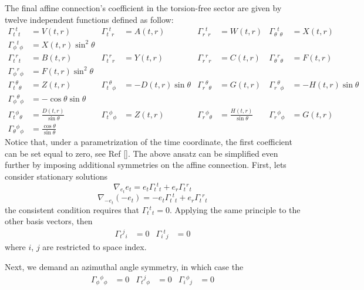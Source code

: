 \documentclass{article}
\providecommand{\ctG}[3]{\Gamma_{#1}{}^{ #2}{}_{#3}}
\begin{document}
The final affine connection's coefficient in the torsion-free sector are given by
twelve independent functions defined as follow:
\begin{equation}
\begin{aligned}
    \ctG{t}{t}{t} & = V(t,r) & \ctG{t}{t}{r} & = A(t,r) & \ctG{r}{t}{r} & = W(t,r) & \ctG{\theta}{t}{\theta} & = X(t,r) \\
    \ctG{\phi}{t}{\phi} & = X(t,r)\sin^2\theta \\
    \ctG{t}{r}{t} & = B(t,r) & \ctG{t}{r}{r} & = Y(t,r) & \ctG{r}{r}{r} & = C(t,r) & \ctG{\theta}{r}{\theta} & = F(t,r) \\
    \ctG{\phi}{r}{\phi} & = F(t,r)\sin^2\theta  \\
    \ctG{t}{\theta}{\theta} & = Z(t,r) & \ctG{t}{\theta}{\phi} & = -D(t,r)\sin\theta & \ctG{r}{\theta}{\theta} & = G(t,r) & \ctG{r}{\theta}{\phi} & = -H(t,r)\sin\theta \\ 
    \ctG{\phi}{\theta}{\phi} & = -\cos\theta\sin\theta \\
    \ctG{t}{\phi}{\theta} & = \frac{D(t,r)}{\sin\theta} & \ctG{t}{\phi}{\phi} & = Z(t,r) & \ctG{r}{\phi}{\theta} & = \frac{H(t,r)}{\sin\theta} & \ctG{r}{\phi}{\phi} & = G(t,r) \\
    \ctG{\theta}{\phi}{\phi} & = \frac{\cos\theta}{\sin \theta}
\end{aligned}
\end{equation}
Notice that, under a parametrization of the time coordinate, the first coefficient
can be set equal to zero, see Ref []. The above ansatz can be simplified even further 
by imposing additional symmetries on the affine connection. First, lets consider 
stationary solutions
\begin{equation}
    \nabla_{e_t}e_t = e_t\ctG{t}{t}{t} + e_r\ctG{t}{r}{t}
\end{equation}
\begin{equation}
    \nabla_{-e_t}\left(-e_t\right) = -e_t\ctG{t}{t}{t} + e_r\ctG{t}{r}{t}
\end{equation}
the consistent condition requires that $\ctG{t}{t}{t} = 0$. Applying the same principle
to the other basis vectors, then
\begin{align}
    \ctG{t}{j}{i} & = 0 & \ctG{i}{t}{j} & = 0
\end{align}
where $i$, $j$ are restricted to space index.

Next, we demand an azimuthal angle symmetry, in which case the
\begin{align}
    \ctG{\phi}{\phi}{\phi} & = 0 & \ctG{t}{j}{\phi} & = 0 & \ctG{i}{\phi}{j} & = 0
\end{align}
\end{document}
